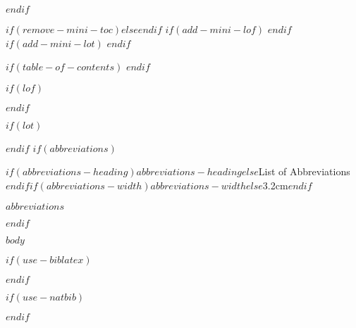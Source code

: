 \documentclass[a4paper, $if(page-layout)$$page-layout$$else$nobind$endif$]{templates/ociamthesis}
\begin{document}
\begin{romanpages}
$endif$

$if(remove-mini-toc)$$else$\dominitoc$endif$ %
$if(add-mini-lof)$
  \dominilof  %
$endif$
$if(add-mini-lot)$
  \dominilot  %
$endif$

\flushbottom

$if(table-of-contents)$
\tableofcontents
$endif$

$if(lof)$
\listoffigures
	\mtcaddchapter
$endif$

$if(lot)$
\listoftables
  \mtcaddchapter
$endif$
$if(abbreviations)$
\begin{mclistof}{$if(abbreviations-heading)$$abbreviations-heading$$else$List of Abbreviations$endif$}{$if(abbreviations-width)$$abbreviations-width$$else$3.2cm$endif$}

$abbreviations$

\end{mclistof} 

$endif$

\end{romanpages}

\flushbottom

$body$


$if(use-biblatex)$
\setlength{\baselineskip}{0pt} %

{\renewcommand*\MakeUppercase[1]{#1}%
\printbibliography[heading=none]}

$endif$

$if(use-natbib)$

$endif$
\end{document}
